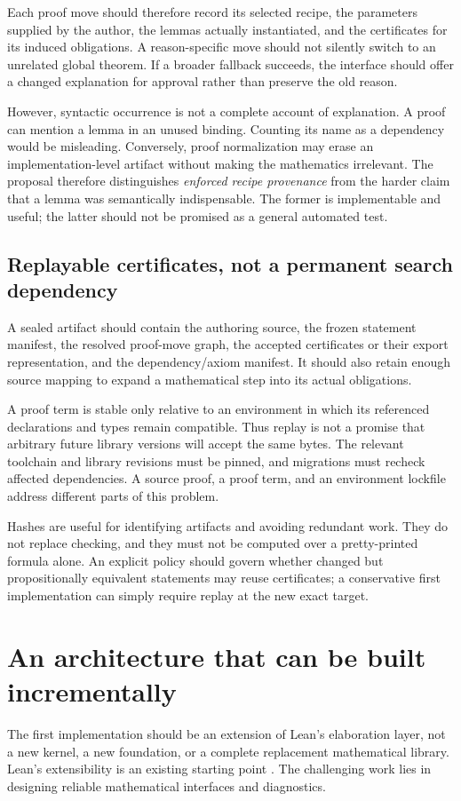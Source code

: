\documentclass[11pt,a4paper]{article}
\theoremstyle{remark}
\begin{document}
Each proof move should therefore record its selected recipe, the parameters supplied by the author, the lemmas actually instantiated, and the certificates for its induced obligations. A reason-specific move should not silently switch to an unrelated global theorem. If a broader fallback succeeds, the interface should offer a changed explanation for approval rather than preserve the old reason.

However, syntactic occurrence is not a complete account of explanation. A proof can mention a lemma in an unused binding. Counting its name as a dependency would be misleading. Conversely, proof normalization may erase an implementation-level artifact without making the mathematics irrelevant. The proposal therefore distinguishes \emph{enforced recipe provenance} from the harder claim that a lemma was semantically indispensable. The former is implementable and useful; the latter should not be promised as a general automated test.

\subsection{Replayable certificates, not a permanent search dependency}
A sealed artifact should contain the authoring source, the frozen statement manifest, the resolved proof-move graph, the accepted certificates or their export representation, and the dependency/axiom manifest. It should also retain enough source mapping to expand a mathematical step into its actual obligations.

A proof term is stable only relative to an environment in which its referenced declarations and types remain compatible. Thus replay is not a promise that arbitrary future library versions will accept the same bytes. The relevant toolchain and library revisions must be pinned, and migrations must recheck affected dependencies. A source proof, a proof term, and an environment lockfile address different parts of this problem.

Hashes are useful for identifying artifacts and avoiding redundant work. They do not replace checking, and they must not be computed over a pretty-printed formula alone. An explicit policy should govern whether changed but propositionally equivalent statements may reuse certificates; a conservative first implementation can simply require replay at the new exact target.

\section{An architecture that can be built incrementally}
\label{sec:implementation}
The first implementation should be an extension of Lean's elaboration layer, not a new kernel, a new foundation, or a complete replacement mathematical library. Lean's extensibility is an existing starting point \cite{lean4}. The challenging work lies in designing reliable mathematical interfaces and diagnostics.
\end{document}
